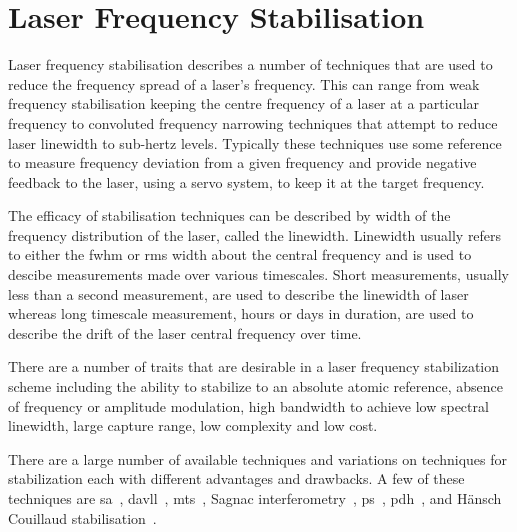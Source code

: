 \section{Laser Frequency Stabilisation}

Laser frequency stabilisation describes a number of techniques that are used to reduce the frequency spread of a laser's frequency.
This can range from weak frequency stabilisation keeping the centre frequency of a laser at a particular frequency to convoluted frequency narrowing techniques that attempt to reduce laser linewidth to sub-hertz levels.
Typically these techniques use some reference to measure frequency deviation from a given frequency and provide negative feedback to the laser, using a servo system, to keep it at the target frequency.

The efficacy of stabilisation techniques can be described by width of the frequency distribution of the laser, called the linewidth.
Linewidth usually refers to either the \gls{fwhm} or \gls{rms} width about the central frequency and is used to descibe measurements made over various timescales.
Short measurements, usually less than a second measurement, are used to describe the linewidth of laser whereas long timescale measurement, hours or days in duration, are used to describe the drift of the laser central frequency over time.

There are a number of traits that are desirable in a laser frequency stabilization scheme including the ability to stabilize to an absolute atomic reference, absence of frequency or amplitude modulation, high bandwidth to achieve low spectral linewidth, large capture range, low complexity and low cost.

There are a large number of available techniques and variations on techniques for stabilization each with different advantages and drawbacks.
A few of these techniques are \gls{sa}~\cite{haroche_theory_1972, maguire_theoretical_2006, cuneo_optically_1994, preston_doppler-free_1996, saliba_linewidths_2009}, \gls{davll}~\cite{corwin_frequency-stabilized_1998, millett-sikking_davll_2007}, \gls{mts}~\cite{shirley_modulation_1982, mccarron_modulation_2008, xiang-hui_ultra-stable_2009,negnevitsky_wideband_2013}, Sagnac interferometry~\cite{robins_Interferometric_2002, jundt_non-linear_2003}, \acrfull{ps}~\cite{wieman_doppler-free_1976, lancaster_polarisation_1999, yoshikawa_frequency_2003, harris_polarization_2006, pearman_polarization_2002, tiwari_laser_2006, do_polarization_2008, torii_laser-phase_2012}, \gls{pdh}~\cite{drever_laser_1983}, and H\"ansch Couillaud stabilisation~\cite{hansch_laser_1980}.

